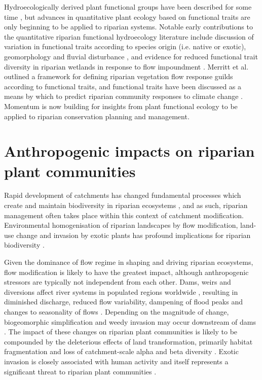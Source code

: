 Hydroecologically derived plant functional groups have been described for some time \citep{Stromberg2010, Casanova2011}, but advances in quantitative plant ecology based on functional traits are only beginning to be applied to riparian systems. Notable early contributions to the quantitative riparian functional hydroecology literature include discussion of variation in functional traits according to species origin (i.e. native or exotic), geomorphology and fluvial disturbance \citep{Kyle2009, Kyle2009a}, and evidence for reduced functional trait diversity in riparian wetlands in response to flow impoundment \citep{Catford2011}. Merritt et al. \citep{Merritt2010} outlined a framework for defining riparian vegetation flow response guilds according to functional traits, and functional traits have been discussed as a means by which to predict riparian community responses to climate change \citep{Catford2012a, Kominoski2013}. Momentum is now building for insights from plant functional ecology to be applied to riparian conservation planning and management.

\section{Anthropogenic impacts on riparian plant communities}
Rapid development of catchments has changed fundamental processes which create and maintain biodiversity in riparian ecosystems \citep{Nilsson2002}, and as such, riparian management often takes place within this context of catchment modification. Environmental homogenisation of riparian landscapes by flow modification, land-use change and invasion by exotic plants has profound implications for riparian biodiversity \citep{Brierley1999, Richardson2007, Poff2010}. 

Given the dominance of flow regime in shaping and driving riparian ecosystems, flow modification is likely to have the greatest impact, although anthropogenic stressors are typically not independent from each other. Dams, weirs and diversions affect river systems in populated regions worldwide \citep{Nilsson2002}, resulting in diminished discharge, reduced flow variability, dampening of flood peaks and changes to seasonality of flows \citep{Graf2006, Singer2007}. Depending on the magnitude of change, biogeomorphic simplification and weedy invasion may occur downstream of dams \citep{Graf2006, Naiman2008, Catford2011}. The impact of these changes on riparian plant communities is likely to be compounded by the deleterious effects of land transformation, primarily habitat fragmentation and loss of catchment-scale alpha and beta diversity \citep{Vitousek1997, Gerstner2014}. Exotic invasion is closely associated with human activity \citep{Vitousek1996} and itself represents a significant threat to riparian plant communities \citep{Richardson2007}.

